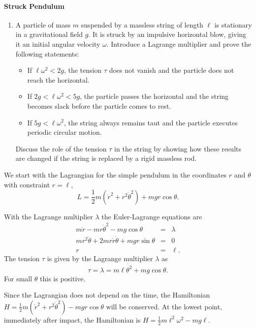 \documentclass[letterpaper,11pt]{article}
\begin{document}
\paragraph*{Struck Pendulum}
\begin{enumerate}[resume]
 \item A particle of mass $m$ suspended by a massless string of length $\ell$ is stationary in a gravitational field $g$.  It is struck by an impulsive horizontal blow, giving it an initial angular velocity $\omega$.  Introduce a Lagrange multiplier and prove the following statements:
 \begin{itemize}
  \item If $\ell\omega^2 < 2g$, the tension $\tau$ does not vanish and the particle does not reach the horizontal.
  \item If $2g < \ell\omega^2 < 5g$, the particle passes the horizontal and the string becomes slack before the particle comes to rest.
  \item If $5g < \ell\omega^2$, the string always remains taut and the particle executes periodic circular motion.
 \end{itemize}
 Discuss the role of the tension $\tau$ in the string by showing how these results are changed if the string is replaced by a rigid massless rod.
\end{enumerate}
We start with the Lagrangian for the simple pendulum in the coordinates $r$ and $\theta$ with constraint $r = \ell$,
\begin{equation*}
 L = \frac{1}{2} m (\dot{r}^2 + r^2 \dot\theta^2) + m g r \cos\theta.
\end{equation*}

With the Lagrange multiplier $\lambda$ the Euler-Lagrange equations are
\begin{eqnarray*}
 m \ddot{r} - mr\dot{\theta}^2 - mg\cos\theta & = & \lambda \\
 m r^2 \ddot{\theta} + 2mr\dot{r}\dot{\theta} + mgr\sin\theta & = & 0 \\
 r & = & \ell.
\end{eqnarray*}
The tension $\tau$ is given by the Lagrange multiplier $\lambda$ as
\begin{equation*}
 \tau = \lambda = m \ell\dot{\theta^2} + mg\cos\theta.
\end{equation*}
For small $\theta$ this is positive.

Since the Lagrangian does not depend on the time, the Hamiltonian $H = \frac{1}{2} m (\dot{r}^2 + r^2 \dot\theta^2) - m g r \cos\theta$ will be conserved.  At the lowest point, immediately after impact, the Hamiltonian is $H = \frac{1}{2} m \ell^2 \omega^2 - m g \ell$.
\end{document}
